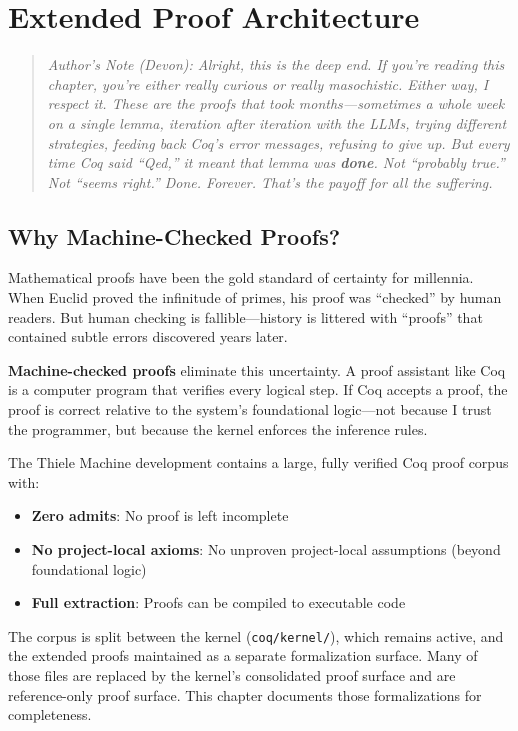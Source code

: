\section{Extended Proof Architecture}

\begin{quote}
\textit{Author's Note (Devon): Alright, this is the deep end. If you're reading this chapter, you're either really curious or really masochistic. Either way, I respect it. These are the proofs that took months---sometimes a whole week on a single lemma, iteration after iteration with the LLMs, trying different strategies, feeding back Coq's error messages, refusing to give up. But every time Coq said ``Qed,'' it meant that lemma was \textbf{done}. Not ``probably true.'' Not ``seems right.'' Done. Forever. That's the payoff for all the suffering.}
\end{quote}

\subsection{Why Machine-Checked Proofs?}

Mathematical proofs have been the gold standard of certainty for millennia. When Euclid proved the infinitude of primes, his proof was ``checked'' by human readers. But human checking is fallible---history is littered with ``proofs'' that contained subtle errors discovered years later.

\textbf{Machine-checked proofs} eliminate this uncertainty. A proof assistant like Coq is a computer program that verifies every logical step. If Coq accepts a proof, the proof is correct relative to the system’s foundational logic---not because I trust the programmer, but because the kernel enforces the inference rules.

The Thiele Machine development contains a large, fully verified Coq proof corpus with:
\begin{itemize}
    \item \textbf{Zero admits}: No proof is left incomplete
    \item \textbf{No project-local axioms}: No unproven project-local assumptions (beyond foundational logic)
    \item \textbf{Full extraction}: Proofs can be compiled to executable code
\end{itemize}
The corpus is split between the kernel (\texttt{coq/kernel/}), which remains active, and the extended proofs maintained as a separate formalization surface. Many of those files are replaced by the kernel's consolidated proof surface and are reference-only proof surface. This chapter documents those formalizations for completeness.

